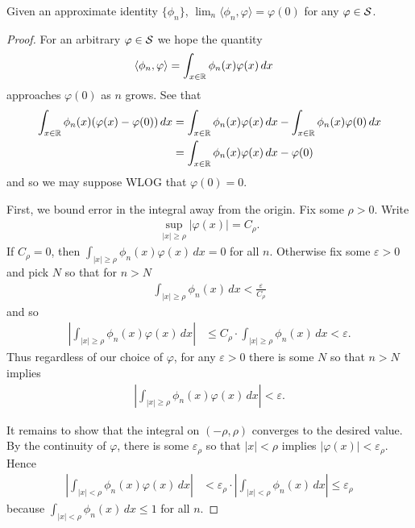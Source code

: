     \begin{thm}
      \label{thm:approxid}
      Given an approximate identity $\{\phi_n\}$, $\lim_n\langle \phi_n,\varphi\rangle = \varphi(0)$ for any $\varphi\in\S$.
    \end{thm}
    \begin{proof}
      For an arbitrary $\varphi\in\S$ we hope the quantity
      \begin{align*}
        \langle\phi_n,\varphi\rangle 
        &=\int_{x\in\R} \phi_n(x)\varphi(x)\,dx
      \end{align*}
      approaches $\varphi(0)$ as $n$ grows.
      See that
      \begin{align*}
        \int_{x\in\R} \phi_n(x)(\varphi(x)-\varphi(0))\,dx
        &= \int_{x\in\R} \phi_n(x)\varphi(x)\,dx - \int_{x\in\R} \phi_n(x)\varphi(0)\,dx
        \\&= \int_{x\in\R} \phi_n(x)\varphi(x)\,dx - \varphi(0)
      \end{align*}
      and so we may suppose WLOG that $\varphi(0)=0$.

      First, we bound error in the integral away from the origin.
      Fix some $\rho>0$.
      Write
      \begin{align*}
        \sup_{|x|\ge\rho} |\varphi(x)| = C_\rho \text{.}
      \end{align*}
      If $C_\rho=0$, then $\int_{|x|\ge\rho} \phi_n(x)\varphi(x)\,dx=0$ for all $n$.
      Otherwise fix some $\varepsilon>0$ and pick $N$ so that for $n>N$
      \begin{align*}
        \int_{|x|\ge\rho} \phi_n(x)\,dx
        < \frac\varepsilon{C_\rho}
      \end{align*}
      and so
      \begin{align*}
        \left| \int_{|x|\ge\rho} \phi_n(x)\varphi(x)\,dx \right|
        &\le C_\rho \cdot \int_{|x|\ge\rho} \phi_n(x)\,dx
        < \varepsilon \text{.}
      \end{align*}
      Thus regardless of our choice of $\varphi$, for any $\varepsilon>0$ there is some $N$ so that $n>N$ implies
      \begin{align*}
        \left| \int_{|x|\ge\rho} \phi_n(x)\varphi(x)\,dx \right|
        < \varepsilon \text{.}
      \end{align*}

      It remains to show that the integral on $(-\rho,\rho)$ converges to the desired value.
      By the continuity of $\varphi$, there is some $\varepsilon_\rho$ so that $|x|<\rho$ implies $|\varphi(x)|<\varepsilon_\rho$.
      Hence
      \begin{align*}
        \left| \int_{|x|<\rho} \phi_n(x)\varphi(x)\,dx \right|
        &< \varepsilon_\rho\cdot \left| \int_{|x|<\rho} \phi_n(x)\,dx \right|
        \le \varepsilon_\rho
      \end{align*}
      because $\int_{|x|<\rho} \phi_n(x)\,dx \le 1$ for all $n$.


\end{proof}
